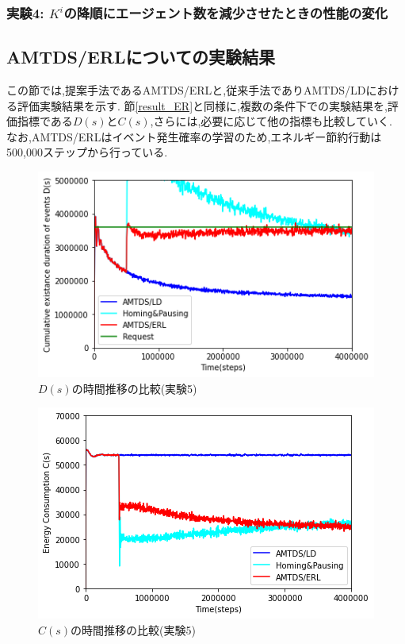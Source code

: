\documentclass[12pt,a4j,twoside]{jarticle}
\begin{document}
  \subsubsection{実験4: $K^i$の降順にエージェント数を減少させたときの性能の変化}

  \subsection{AMTDS/ERLについての実験結果}
  \label{result_ERL}
  この節では,提案手法であるAMTDS/ERLと,従来手法でありAMTDS/LDにおける評価実験結果を示す.
  節\ref{result_ER}と同様に,複数の条件下での実験結果を,評価指標である$D(s)$と$C(s)$,さらには,必要に応じて他の指標も比較していく.
  なお,AMTDS/ERLはイベント発生確率の学習のため,エネルギー節約行動は500,000ステップから行っている.

  \begin{figure}
    \centering
    \includegraphics[width=150mm]{figures/ds_graph_3600_ave_ERL_Office_1000.png}
    \caption{$D(s)$の時間推移の比較(実験5)}
    \label{fig:ds_ERL_Office}
  \end{figure}

  \begin{figure}
    \centering
    \includegraphics[width=150mm]{figures/cs_graph_3600_ave_ERL_Office_1000.png}
    \caption{$C(s)$の時間推移の比較(実験5)}
    \label{fig:cs_ERL_Office}
  \end{figure}
\end{document}
